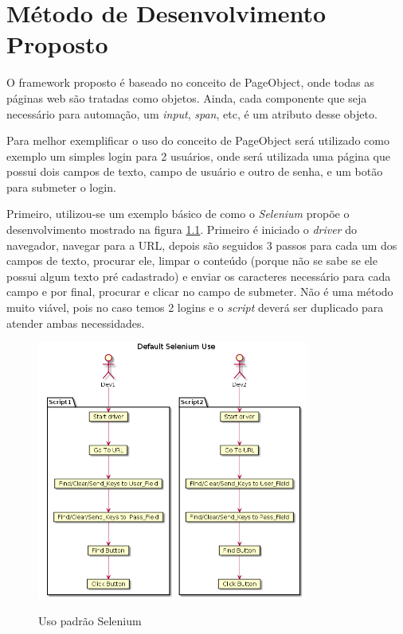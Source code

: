 %
%

\chapter{Método de Desenvolvimento Proposto}\label{chap:proj}
    O framework proposto é baseado no conceito de PageObject, onde todas as páginas web são tratadas como objetos.
    Ainda, cada componente que seja necessário para automação, um \emph{input}, \emph{span}, etc, é um atributo desse objeto.

    Para melhor exemplificar o uso do conceito de PageObject será utilizado como exemplo um simples login para 2
    usuários, onde será utilizada uma página que possui dois campos de texto, campo de usuário e outro de senha,
    e um botão para submeter o login.

    Primeiro, utilizou-se um exemplo básico de como o \textit{Selenium} propõe o desenvolvimento mostrado na figura
    \ref{fig:selenium_default}. Primeiro é iniciado o \emph{driver} do navegador, navegar para a URL, depois
    são seguidos 3 passos para cada um dos campos de texto, procurar ele, limpar o conteúdo
    (porque não se sabe se ele possui algum texto pré cadastrado) e enviar os caracteres necessário para
    cada campo e por final, procurar e clicar no campo de submeter. Não é uma método muito viável, pois
    no caso temos 2 logins e o \emph{script} deverá ser duplicado para atender ambas necessidades.

    \begin{figure}[H]
        \vspace*{0,3cm}
        \centering
        \caption{Uso padrão Selenium}
        \includegraphics[width=0.8\textwidth]{./04-figuras/page_object_selenium}
        \label{fig:selenium_default}
    \end{figure}

